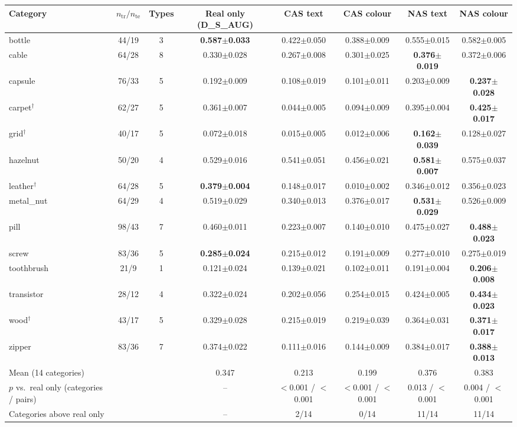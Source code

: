 \begin{tabular}{@{}l c c c c c c c@{}}
\toprule
Category & $n_\text{tr}/n_\text{te}$ & Types & Real only (D\_S\_AUG) & CAS text & CAS colour & NAS text & NAS colour \\
\midrule
bottle & 44/19 & 3 & \textbf{0.587$\pm$0.033} & 0.422$\pm$0.050 & 0.388$\pm$0.009 & 0.555$\pm$0.015 & 0.582$\pm$0.005 \\
cable & 64/28 & 8 & 0.330$\pm$0.028 & 0.267$\pm$0.008 & 0.301$\pm$0.025 & \textbf{0.376$\pm$0.019} & 0.372$\pm$0.006 \\
capsule & 76/33 & 5 & 0.192$\pm$0.009 & 0.108$\pm$0.019 & 0.101$\pm$0.011 & 0.203$\pm$0.009 & \textbf{0.237$\pm$0.028} \\
carpet$^\dagger$ & 62/27 & 5 & 0.361$\pm$0.007 & 0.044$\pm$0.005 & 0.094$\pm$0.009 & 0.395$\pm$0.004 & \textbf{0.425$\pm$0.017} \\
grid$^\dagger$ & 40/17 & 5 & 0.072$\pm$0.018 & 0.015$\pm$0.005 & 0.012$\pm$0.006 & \textbf{0.162$\pm$0.039} & 0.128$\pm$0.027 \\
hazelnut & 50/20 & 4 & 0.529$\pm$0.016 & 0.541$\pm$0.051 & 0.456$\pm$0.021 & \textbf{0.581$\pm$0.007} & 0.575$\pm$0.037 \\
leather$^\dagger$ & 64/28 & 5 & \textbf{0.379$\pm$0.004} & 0.148$\pm$0.017 & 0.010$\pm$0.002 & 0.346$\pm$0.012 & 0.356$\pm$0.023 \\
metal\_nut & 64/29 & 4 & 0.519$\pm$0.029 & 0.340$\pm$0.013 & 0.376$\pm$0.017 & \textbf{0.531$\pm$0.029} & 0.526$\pm$0.009 \\
pill & 98/43 & 7 & 0.460$\pm$0.011 & 0.223$\pm$0.007 & 0.140$\pm$0.010 & 0.475$\pm$0.027 & \textbf{0.488$\pm$0.023} \\
screw & 83/36 & 5 & \textbf{0.285$\pm$0.024} & 0.215$\pm$0.012 & 0.191$\pm$0.009 & 0.277$\pm$0.010 & 0.275$\pm$0.019 \\
toothbrush & 21/9 & 1 & 0.121$\pm$0.024 & 0.139$\pm$0.021 & 0.102$\pm$0.011 & 0.191$\pm$0.004 & \textbf{0.206$\pm$0.008} \\
transistor & 28/12 & 4 & 0.322$\pm$0.024 & 0.202$\pm$0.056 & 0.254$\pm$0.015 & 0.424$\pm$0.005 & \textbf{0.434$\pm$0.023} \\
wood$^\dagger$ & 43/17 & 5 & 0.329$\pm$0.028 & 0.215$\pm$0.019 & 0.219$\pm$0.039 & 0.364$\pm$0.031 & \textbf{0.371$\pm$0.017} \\
zipper & 83/36 & 7 & 0.374$\pm$0.022 & 0.111$\pm$0.016 & 0.144$\pm$0.009 & 0.384$\pm$0.017 & \textbf{0.388$\pm$0.013} \\
\midrule
Mean (14 categories) & & & 0.347 & 0.213 & 0.199 & 0.376 & 0.383 \\
$p$ vs.\ real only (categories / pairs) & & & -- & $<$0.001 / $<$0.001 & $<$0.001 / $<$0.001 & 0.013 / $<$0.001 & 0.004 / $<$0.001 \\
Categories above real only & & & -- & 2/14 & 0/14 & 11/14 & 11/14 \\
\bottomrule
\end{tabular}
